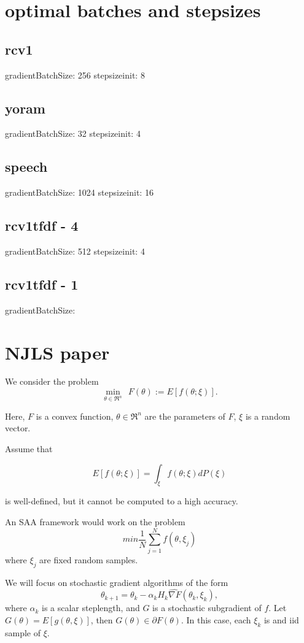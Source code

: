 \documentclass{article}
\begin{document}
	
\section*{optimal batches and stepsizes}
\subsection{rcv1}
gradientBatchSize: 256
stepsizeinit: 8
\subsection{yoram}
gradientBatchSize: 32
stepsizeinit: 4
\subsection{speech}
gradientBatchSize: 1024
stepsizeinit: 16
\subsection{rcv1tfdf - 4}  
gradientBatchSize: 512
         stepsizeinit: 4	
\subsection{rcv1tfdf - 1}  
gradientBatchSize:
\section*{NJLS paper}

We consider the problem
 \[
  \boxed{\min_{\theta \in\Re^n} \ \ F(\theta) := E[f(\theta;\xi)].}
 \]

Here, $F$ is a convex function, $\theta\in\Re^n$ are the parameters of $F$, $\xi$ is a random vector.
 
Assume that

\[
 E[f(\theta;\xi)] = \int_{\xi} f(\theta;\xi) dP(\xi)
\]

is well-defined, but it cannot be computed to a high accuracy. 

An SAA framework would work on the problem
\[
	min \frac{1}{N} \sum_{j=1}^{N} f(\theta, \xi_j)
\]
where $\xi_j$ are fixed random samples. 

We will focus on stochastic gradient algorithms of the form
\begin{equation}
 \boxed{\theta_{k+1} = \theta_k - \alpha_k H_k\hat{\nabla F}(\theta_k,  \xi_k),}
 \label{eq:iter}
\end{equation}
where  $\alpha_k$ is a scalar steplength, and $G$ is a stochastic subgradient of $f$. Let $G(\theta) = E[g(\theta, \xi)]$, then $G(\theta) \in \partial F(\theta)$. In this case, each $\xi_k$ is and iid sample of $\xi$.
\end{document}
